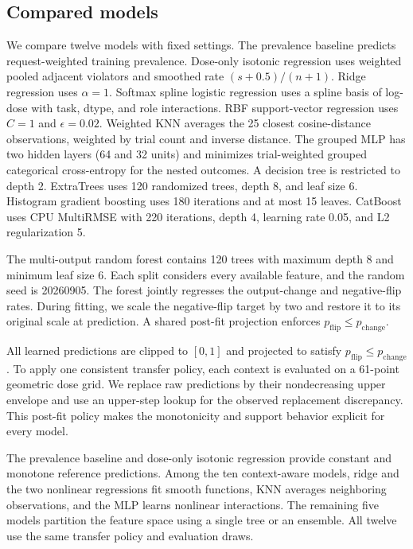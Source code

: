 \documentclass{article}
\begin{document}
\subsection{Compared models}

We compare twelve models with fixed settings. The prevalence baseline predicts request-weighted training prevalence. Dose-only isotonic regression uses weighted pooled adjacent violators and smoothed rate $(s+0.5)/(n+1)$. Ridge regression uses $\alpha=1$. Softmax spline logistic regression uses a spline basis of log-dose with task, dtype, and role interactions. RBF support-vector regression uses $C=1$ and $\epsilon=0.02$. Weighted KNN averages the 25 closest cosine-distance observations, weighted by trial count and inverse distance. The grouped MLP has two hidden layers (64 and 32 units) and minimizes trial-weighted grouped categorical cross-entropy for the nested outcomes. A decision tree is restricted to depth 2. ExtraTrees uses 120 randomized trees, depth 8, and leaf size 6. Histogram gradient boosting uses 180 iterations and at most 15 leaves. CatBoost uses CPU MultiRMSE with 220 iterations, depth 4, learning rate 0.05, and L2 regularization 5.

The multi-output random forest contains 120 trees with maximum depth 8 and minimum leaf size 6. Each split considers every available feature, and the random seed is 20260905. The forest jointly regresses the output-change and negative-flip rates. During fitting, we scale the negative-flip target by two and restore it to its original scale at prediction. A shared post-fit projection enforces $p_{\mathrm{flip}}\leq p_{\mathrm{change}}$.

All learned predictions are clipped to $[0,1]$ and projected to satisfy $p_{\mathrm{flip}}\leq p_{\mathrm{change}}$. To apply one consistent transfer policy, each context is evaluated on a 61-point geometric dose grid. We replace raw predictions by their nondecreasing upper envelope and use an upper-step lookup for the observed replacement discrepancy. This post-fit policy makes the monotonicity and support behavior explicit for every model.

The prevalence baseline and dose-only isotonic regression provide constant and monotone reference predictions. Among the ten context-aware models, ridge and the two nonlinear regressions fit smooth functions, KNN averages neighboring observations, and the MLP learns nonlinear interactions. The remaining five models partition the feature space using a single tree or an ensemble. All twelve use the same transfer policy and evaluation draws.
\end{document}
